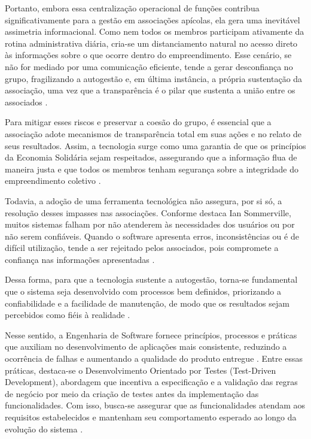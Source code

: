 Portanto, embora essa centralização operacional de funções contribua significativamente para a gestão em associações apícolas, ela gera uma inevitável assimetria informacional. Como nem todos os membros participam ativamente da rotina administrativa diária, cria-se um distanciamento natural no acesso direto às informações sobre o que ocorre dentro do empreendimento. Esse cenário, se não for mediado por uma comunicação eficiente, tende a gerar desconfiança no grupo, fragilizando a autogestão e, em última instância, a própria sustentação da associação, uma vez que a transparência é o pilar que sustenta a união entre os associados \cite{bertolin2008}.

Para mitigar esses riscos e preservar a coesão do grupo, é essencial que a associação adote mecanismos de transparência total em suas ações e no relato de seus resultados. Assim, a tecnologia surge como uma garantia de que os princípios da Economia Solidária sejam respeitados, assegurando que a informação flua de maneira justa e que todos os membros tenham segurança sobre a integridade do empreendimento coletivo \cite{aguiar2026,aprova2025}.

Todavia, a adoção de uma ferramenta tecnológica não assegura, por si só, a resolução desses impasses nas associações. Conforme destaca Ian Sommerville, muitos sistemas falham por não atenderem às necessidades dos usuários ou por não serem confiáveis. Quando o software apresenta erros, inconsistências ou é de difícil utilização, tende a ser rejeitado pelos associados, pois compromete a confiança nas informações apresentadas \cite{sommerville2019}.

Dessa forma, para que a tecnologia sustente a autogestão, torna-se fundamental que o sistema seja desenvolvido com processos bem definidos, priorizando a confiabilidade e a facilidade de manutenção, de modo que os resultados sejam percebidos como fiéis à realidade \cite{iso25010}.

Nesse sentido, a Engenharia de Software fornece princípios, processos e práticas que auxiliam no desenvolvimento de aplicações mais consistente, reduzindo a ocorrência de falhas e aumentando a qualidade do produto entregue \cite{sommerville2019}. Entre essas práticas, destaca-se o Desenvolvimento Orientado por Testes (Test-Driven Development), abordagem que incentiva a especificação e a validação das regras de negócio por meio da criação de testes antes da implementação das funcionalidades. Com isso, busca-se assegurar que as funcionalidades atendam aos requisitos estabelecidos e mantenham seu comportamento esperado ao longo da evolução do sistema \cite{beck2002}.

